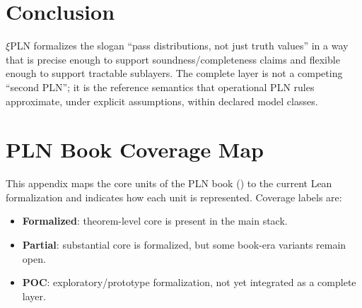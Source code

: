 \documentclass[]{article}
\newcommand{\xiPLN}{\texorpdfstring{$\xi$}{xi}\textup{PLN}}
\begin{document}
\section{Conclusion}

\xiPLN{} formalizes the slogan ``pass distributions, not just truth values'' in a way that is
precise enough to support soundness/completeness claims and flexible enough to support tractable
sublayers.  The complete layer is not a competing ``second PLN''; it is the reference semantics
that operational PLN rules approximate, under explicit assumptions, within declared model classes.

\appendix
\section{PLN Book Coverage Map}
\label{app:pln-book-coverage}

This appendix maps the core units of the PLN book (\cite{goertzel2009pln}) to
the current Lean formalization and indicates how each unit is represented.
Coverage labels are:
\begin{itemize}
\item \textbf{Formalized}: theorem-level core is present in the main stack.
\item \textbf{Partial}: substantial core is formalized, but some book-era variants remain open.
\item \textbf{POC}: exploratory/prototype formalization, not yet integrated as a complete layer.
\end{itemize}
\end{document}

